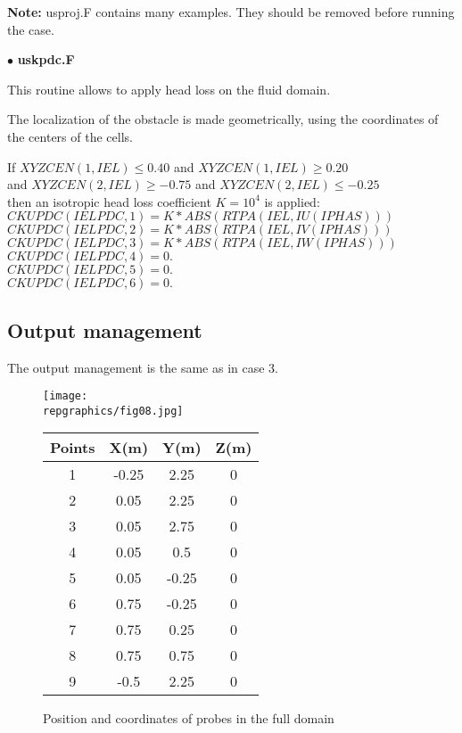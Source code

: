 \textbf{Note:} usproj.F contains many examples. They should be removed before
running the case.


$\bullet$ {\bfseries uskpdc.F}

This routine allows to apply head loss on the fluid domain.

The localization of the obstacle is made geometrically, using the
coordinates of the centers of the cells.


If $XYZCEN(1,IEL) \leq 0.40$ and $XYZCEN(1,IEL) \geq 0.20$ \\
and $XYZCEN(2,IEL) \geq -0.75$ and $XYZCEN(2,IEL) \leq -0.25$\\
then an isotropic head loss coefficient $K = 10^{4}$ is applied:\\

$CKUPDC(IELPDC,1) = K*ABS(RTPA(IEL,IU(IPHAS)))$ \\
$CKUPDC(IELPDC,2) = K*ABS(RTPA(IEL,IV(IPHAS)))$ \\
$CKUPDC(IELPDC,3) = K*ABS(RTPA(IEL,IW(IPHAS)))$ \\
$CKUPDC(IELPDC,4) = 0.$ \\
$CKUPDC(IELPDC,5) = 0.$ \\
$CKUPDC(IELPDC,6) = 0.$

        \subsection{Output management}

The output management is the same as in case 3.

\begin{figure}[htp]
\parbox{8cm}{%
\centerline{\texttt{[image: \\repgraphics/fig08.jpg]}}}
\parbox{7cm}{%
\begin{center}
\begin{tabular}{|c|c|c|c|}
\hline
Points & X(m) & Y(m) & Z(m)\\
\hline
1 & -0.25 & 2.25 & 0 \\
\hline
2 & 0.05 & 2.25 & 0 \\
\hline
3 & 0.05 & 2.75 & 0 \\
\hline
4 & 0.05 & 0.5 & 0 \\
\hline
5 & 0.05 & -0.25 & 0 \\
\hline
6 & 0.75 & -0.25 & 0 \\
\hline
7 & 0.75 & 0.25 & 0 \\
\hline
8 & 0.75 & 0.75 & 0 \\
\hline
9 & -0.5 & 2.25 & 0 \\
\hline
\end{tabular}
\end{center}
}
\caption{Position and coordinates of probes in the full domain}
\label{figante42}
\end{figure}

